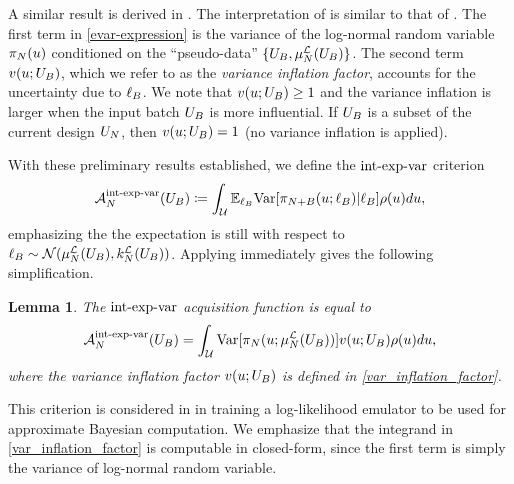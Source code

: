 \documentclass[12pt]{article}
\newtheorem{lemma}{Lemma}
\begin{document}
A similar result is derived in \cite{VehtariParallelGP}.
The interpretation of  is similar to that of . 
The first term in \ref{evar-expression} is the variance of the log-normal random variable
 $\llikEmRdmDens[\Ndesign](\Par)$ conditioned on the ``pseudo-data''
 $\{\designBatchIn, \emMean[\Ndesign]{\llik}(\designBatchIn)\}$. The second term 
 $\varInflation(\Par; \designBatchIn)$, which we refer to as the \textit{variance inflation factor}, 
 accounts for the uncertainty due to $\designBatchLlik$. We note that 
$\varInflation(\Par; \designBatchIn) \geq 1$ and the variance inflation is larger when the 
input batch $\designBatchIn$ is more influential. If $\designBatchIn$ is a subset of the 
current design $\designIn[\Ndesign]$, then $\varInflation(\Par; \designBatchIn) = 1$ (no 
variance inflation is applied). 

With these preliminary results established, we define the $\intExpVarLabel$ criterion
\begin{align}
\labelAcq[\Ndesign]{\intExpVarLabel}(\designBatchIn) \Def
\int_{\parSpace} \E_{\designBatchLlik} \Var[\llikEmRdmDens[\Naugment](\Par; \designBatchLlik) | \designBatchLlik] \weightDens(\Par) d\Par, 
\end{align}
emphasizing the the expectation is still with respect to 
$\designBatchLlik \sim \Gaussian(\emMean[\Ndesign]{\llik}(\designBatchIn), \emKer[\Ndesign]{\llik}(\designBatchIn))$. 
Applying  immediately gives the following simplification. 
\begin{lemma}
The $\intExpVarLabel$ acquisition function is equal to 
\begin{align}
\labelAcq[\Ndesign]{\intExpVarLabel}(\designBatchIn) =
\int_{\parSpace} \Var[\llikEmRdmDens[\Ndesign](\Par; \emMean[\Ndesign]{\llik}(\designBatchIn))]
	\varInflation(\Par; \designBatchIn) \weightDens(\Par) d\Par, 
\end{align}
where the variance inflation factor $\varInflation(\Par; \designBatchIn)$ is defined in \ref{var_inflation_factor}. 
\end{lemma}
This criterion is considered in \cite{VehtariParallelGP} in training a log-likelihood emulator to be used for 
approximate Bayesian computation. We emphasize that the integrand in \ref{var_inflation_factor} is 
computable in closed-form, since the first term is simply the variance of log-normal random variable. 
\end{document}
